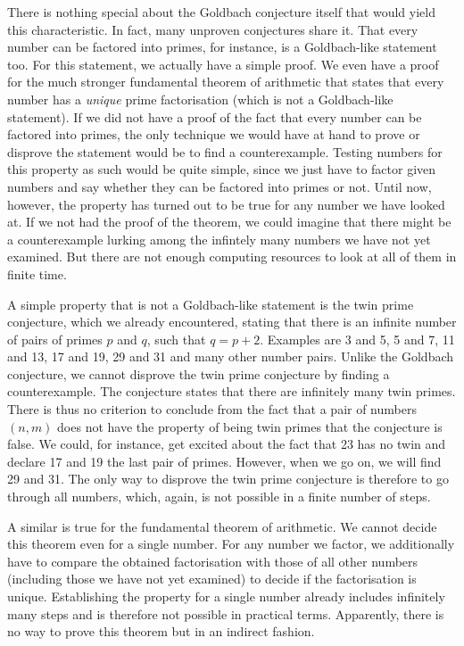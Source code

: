\documentclass{scrreprt}
\begin{document}
There is nothing special about the Goldbach conjecture
itself that would yield this characteristic.
In fact, many unproven conjectures share it.
That every number can be factored
into primes, for instance, is a Goldbach-like statement too.
For this statement, we actually have a simple proof.
We even have a proof 
for the much stronger fundamental theorem of arithmetic
that states that every number
has a \emph{unique} prime factorisation 
(which is not a Goldbach-like statement). 
If we did not have a proof of the fact
that every number can be factored into primes,
the only technique we would have at hand
to prove or disprove the statement
would be to find a counterexample.
Testing numbers for this property as such would be quite simple,
since we just have to factor given numbers
and say whether they can be factored into primes or not.
Until now, however,
the property has turned out to be true
for any number we have looked at.
If we not had the proof of the theorem,
we could imagine that 
there might be a counterexample lurking
among the infintely many numbers
we have not yet examined.
But there are not enough computing resources
to look at all of them in finite time.

A simple property
that is not a Goldbach-like statement
is the twin prime conjecture,
which we already encountered, stating
that there is an infinite number of pairs of primes
$p$ and $q$, such that $q = p + 2$. 
Examples are 3 and 5, 5 and 7,
11 and 13, 17 and 19, 29 and 31 and many
other number pairs. Unlike the Goldbach conjecture,
we cannot disprove the twin prime conjecture
by finding a counterexample.
The conjecture states that there are infinitely
many twin primes. There is thus
no criterion to conclude from the fact
that a pair of numbers $(n,m)$ 
does not have the property of being twin primes
that the conjecture is false.
We could, for instance, get excited
about the fact that 23 has no twin
and declare 17 and 19 the last pair of primes.
However, when we go on, we will find 29 and 31.
The only way to disprove
the twin prime conjecture is therefore
to go through all numbers, which,
again, is not possible in a finite
number of steps.

A similar is true for the fundamental theorem of arithmetic.
We cannot decide this theorem even for a single number.
For any number we factor, we additionally have to compare
the obtained factorisation with those of all other numbers
(including those we have not yet examined)
to decide if the factorisation is unique.
Establishing the property for a single number
already includes infinitely many steps and is
therefore not possible in practical terms.
Apparently, there is no way to prove this theorem
but in an indirect fashion.
\end{document}
